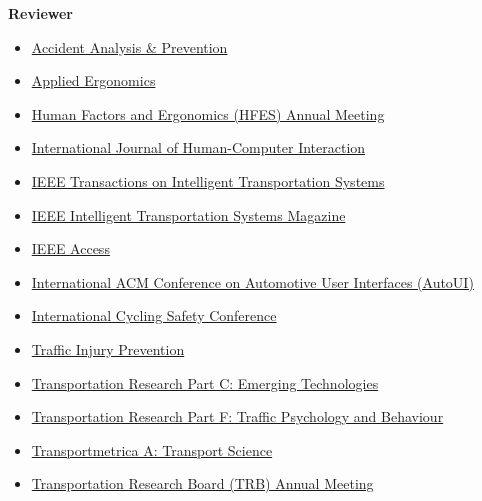 \documentclass[11pt]{article}
\newenvironment{main}
{\begin{adjustwidth}{3em}{}}
{\end{adjustwidth}}
\begin{document}
\begin{main}
\textbf{Reviewer}
\begin{itemize}
    \item \href{https://www.journals.elsevier.com/accident-analysis-and-prevention}{Accident Analysis \& Prevention}
    \item \href{https://www.journals.elsevier.com/applied-ergonomics}{Applied Ergonomics}
    \item \href{www.hfes.org}{Human Factors and Ergonomics (HFES) Annual Meeting}
    \item \href{https://www.tandfonline.com/toc/hihc20/current}{International Journal of Human-Computer Interaction}
    \item \href{https://ieeexplore.ieee.org/xpl/RecentIssue.jsp?punumber=6979}{IEEE Transactions on Intelligent Transportation Systems}
    \item \href{https://ieeexplore.ieee.org/xpl/RecentIssue.jsp?punumber=5117645}{IEEE Intelligent Transportation Systems Magazine}
    \item \href{https://ieeexplore.ieee.org/xpl/RecentIssue.jsp?punumber=6287639}{IEEE Access}
    \item \href{www.auto-ui.org}{International ACM Conference on Automotive User Interfaces (AutoUI)}
    \item \href{www.cyclingsafety.net}{International Cycling Safety Conference}
    \item \href{https://www.tandfonline.com/toc/gcpi20/current}{Traffic Injury Prevention}
    \item \href{https://www.journals.elsevier.com/transportation-research-part-c-emerging-technologies}{Transportation Research Part C: Emerging Technologies}
    \item \href{https://www.journals.elsevier.com/transportation-research-part-f-traffic-psychology-and-behaviour}{Transportation Research Part F: Traffic Psychology and Behaviour}
    \item \href{https://www.tandfonline.com/toc/ttra21/current}{Transportmetrica A: Transport Science}
    \item \href{http://www.trb.org/AnnualMeeting/}{Transportation Research Board (TRB) Annual Meeting}
\end{itemize}



\end{main}
\end{document}
